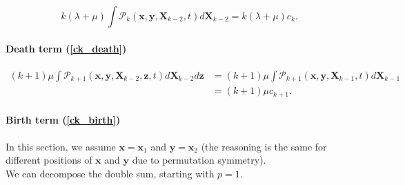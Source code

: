 \begin{equation}
k(\lambda+\mu)\int\mathcal{P}_{k}(\boldsymbol{x},\boldsymbol{y},\boldsymbol{X}_{k-2},t)d\boldsymbol{X}_{k-2}=k(\lambda+\mu)c_{k}.\label{2nd_term_deriv}
\end{equation}


\paragraph*{Death term (\ref{ck_death})}

\begin{subequations} 
\begin{align}
(k+1)\mu\int\mathcal{P}_{k+1}(\boldsymbol{x},\boldsymbol{y},\boldsymbol{X}_{k-2},\boldsymbol{z},t)d\boldsymbol{X}_{k-2}d\boldsymbol{z} & =(k+1)\mu\int\mathcal{P}_{k+1}(\boldsymbol{x},\boldsymbol{y},\boldsymbol{X}_{k-1},t)d\boldsymbol{X}_{k-1}\label{ck_death_2}\\
 & =(k+1)\mu c_{k+1}.\label{death_term_deriv}
\end{align}
\end{subequations}

\paragraph*{Birth term (\ref{ck_birth})}

\textbf{}


In this section, we assume $\boldsymbol{x}=\boldsymbol{x}_{1}$ and
$\boldsymbol{y}=\boldsymbol{x}_{2}$ (the reasoning is the same for
different positions of $\boldsymbol{x}$ and $\boldsymbol{y}$ due
to permutation symmetry). \\

We can decompose the double sum, starting with $p=1$.

